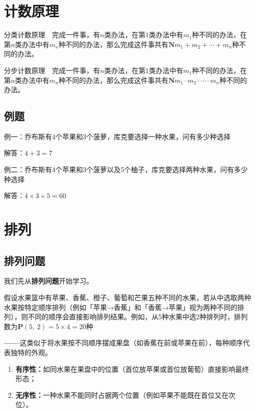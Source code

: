 \documentclass[a5paper]{article}
\begin{document}
\section{\textbf{计数原理}}

{\large 分类计数原理}~~完成一件事，有$n$类办法，在第1类办法中有$m_1$种不同的办法，在第$n$类办法中有$m_n$种不同的办法，那么完成这件事共有$\mathbf{N}m_{1}+m_{2}+\cdots{}+m_{n}$种不同的办法。

{\large 分步计数原理}~~完成一件事，有$n$类办法，在第1类办法中有$m_1$种不同的办法，在第$n$类办法中有$m_n$种不同的办法，那么完成这件事共有$\mathbf{N}m_{1}\cdot{}m_{2}\cdot{}\cdots{}\cdot{}m_{n}$种不同的办法。

\subsection{例题}

{\color{blue} 例一：}乔布斯有4个苹果和3个菠萝，库克要选择一种水果，问有多少种选择

{\color{blue} 解答：}$4+3=7$

{\color{blue} 例二：}乔布斯有4个苹果和3个菠萝以及5个柚子，库克要选择两种水果，问有多少种选择

{\color{blue} 解答：}$4\times{}3\times{}5=60$

\section{\textbf{排列}}

\subsection{排列问题}

我们先从\textbf{排列问题}开始学习。

假设水果篮中有苹果、香蕉、橙子、葡萄和芒果五种不同的水果，若从中选取两种水果按特定顺序排列（例如「苹果→香蕉」和「香蕉→苹果」视为两种不同的排列），则不同的顺序会直接影响排列结果。例如，从5种水果中选2种排列时，排列数为$\textbf{P}(5,~2) = 5 \times 4 = 20$种

\textbf{——}这类似于将水果按不同顺序摆成果盘（如香蕉在前或苹果在前），每种顺序代表独特的外观。

\begin{enumerate}
    \item \textbf{有序性：}如同水果在果盘中的位置（首位放苹果或首位放葡萄）直接影响最终形态；
    \item \textbf{无序性：}一种水果不能同时占据两个位置（例如苹果不能既在首位又在次位）。
\end{enumerate}
\end{document}
